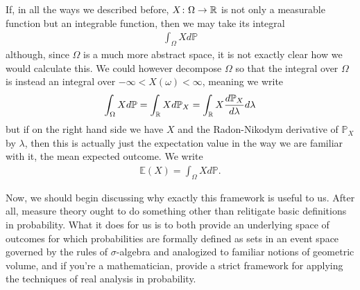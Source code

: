 \documentclass[11pt]{article}
\begin{document}
If, in all the ways we described before, $X \colon \Omega \to \mathbb{R}$ is not only a measurable function but an integrable function, then we may take its integral \begin{gather*}
\int_\Omega X d\mathbb{P}
\end{gather*}
although, since $\Omega$ is a much more abstract space, it is not exactly clear how we would calculate this. We could however decompose $\Omega$ so that the integral over $\Omega$ is instead an integral over $-\infty < X(\omega) < \infty$, meaning we write \begin{gather*}
\int_\Omega X d\mathbb{P} = \int_{\mathbb{R}} X d\mathbb{P}_X = \int_{\mathbb{R}} X \frac{d\mathbb{P}_X}{d\lambda} d\lambda
\end{gather*}
but if on the right hand side we have $X$ and the Radon-Nikodym derivative of $\mathbb{P}_X$ by $\lambda$, then this is actually just the expectation value in the way we are familiar with it, the mean expected outcome. We write \begin{gather*}
\mathbb{E}(X) = \int_\Omega X d\mathbb{P}.
\end{gather*}

Now, we should begin discussing why exactly this framework is useful to us. After all, measure theory ought to do something other than relitigate basic definitions in probability. What it does for us is to both provide an underlying space of outcomes for which probabilities are formally defined as sets in an event space governed by the rules of $\sigma$-algebra and analogized to familiar notions of geometric volume, and if you're a mathematician, provide a strict framework for applying the techniques of real analysis in probability.
\end{document}
